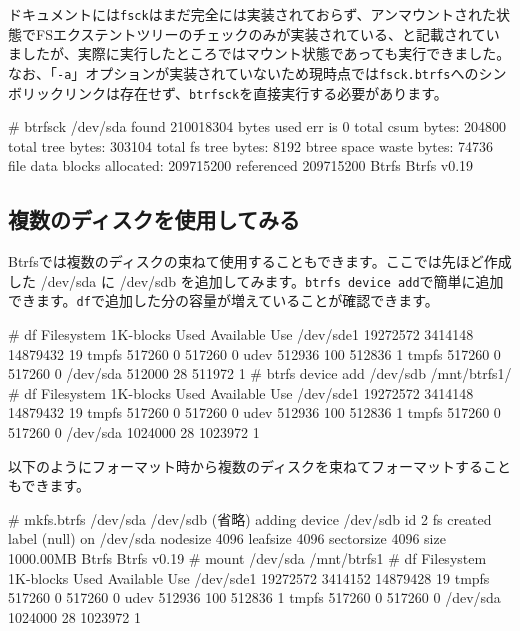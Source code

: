 \documentclass[mingoth,a4paper]{jsarticle}
\begin{document}
ドキュメントには\texttt{fsck}はまだ完全には実装されておらず、アンマウントされた状態でFSエクステントツリーのチェックのみが実装されている、と記載されていましたが、実際に実行したところではマウント状態であっても実行できました。
なお、「\texttt{-a}」オプションが実装されていないため現時点では\texttt{fsck.btrfs}へのシンボリックリンクは存在せず、\texttt{btrfsck}を直接実行する必要があります。
\begin{commandline}
# btrfsck /dev/sda
found 210018304 bytes used err is 0
total csum bytes: 204800
total tree bytes: 303104
total fs tree bytes: 8192
btree space waste bytes: 74736
file data blocks allocated: 209715200
 referenced 209715200
Btrfs Btrfs v0.19
\end{commandline}

\subsection{複数のディスクを使用してみる}
Btrfsでは複数のディスクの束ねて使用することもできます。ここでは先ほど作成した /dev/sda に /dev/sdb を追加してみます。\texttt{btrfs device add}で簡単に追加できます。\texttt{df}で追加した分の容量が増えていることが確認できます。
\begin{commandline}
# df
Filesystem           1K-blocks      Used Available Use%
/dev/sde1             19272572   3414148  14879432  19%
tmpfs                   517260         0    517260   0%
udev                    512936       100    512836   1%
tmpfs                   517260         0    517260   0%
/dev/sda                512000        28    511972   1%
# btrfs device add /dev/sdb /mnt/btrfs1/
# df
Filesystem           1K-blocks      Used Available Use%
/dev/sde1             19272572   3414148  14879432  19%
tmpfs                   517260         0    517260   0%
udev                    512936       100    512836   1%
tmpfs                   517260         0    517260   0%
/dev/sda               1024000        28   1023972   1%
\end{commandline}
以下のようにフォーマット時から複数のディスクを束ねてフォーマットすることもできます。
\begin{commandline}
# mkfs.btrfs /dev/sda /dev/sdb
(省略)
adding device /dev/sdb id 2
fs created label (null) on /dev/sda
        nodesize 4096 leafsize 4096 sectorsize 4096 size 1000.00MB
Btrfs Btrfs v0.19
# mount /dev/sda /mnt/btrfs1
# df
Filesystem           1K-blocks      Used Available Use%
/dev/sde1             19272572   3414152  14879428  19%
tmpfs                   517260         0    517260   0%
udev                    512936       100    512836   1%
tmpfs                   517260         0    517260   0%
/dev/sda               1024000        28   1023972   1%
\end{commandline}
\end{document}
